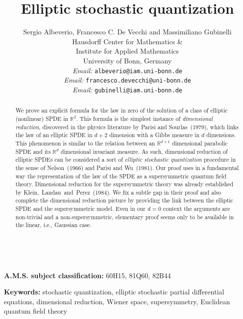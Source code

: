 \documentclass[a4paper,10pt]{article}
\newcommand{\tmaffiliation}[1]{\\ #1}
\newcommand{\tmemail}[1]{\\ \textit{Email:} \texttt{#1}}
\newcommand{\tmsep}{, }
\newcommand{\tmtextit}[1]{{\itshape{#1}}}
\newcommand{\tmkeywords}{\textbf{Keywords:} }
\newcommand{\tmmsc}{\textbf{A.M.S. subject classification:} }
\begin{document}
\title{ Elliptic stochastic quantization}

\author{
  Sergio Albeverio, Francesco C. De Vecchi and Massimiliano Gubinelli
  \tmaffiliation{Hausdorff Center for Mathematics \& \\
  Institute for Applied Mathematics\\
  University of Bonn, Germany}
  \tmemail{albeverio@iam.uni-bonn.de}
  \tmemail{francesco.devecchi@uni-bonn.de}
  \tmemail{gubinelli@iam.uni-bonn.de}
}

\date{}

\maketitle

\begin{abstract}
  We prove an explicit formula for the law in zero of the solution of a class
  of elliptic (nonlinear) SPDE in $\mathbb{R}^2$. This formula is the simplest
  instance of \tmtextit{dimensional reduction}, discovered in the physics
  literature by Parisi and Sourlas~(1979), which links the law of an elliptic
  SPDE in $d + 2$ dimension with a Gibbs measure in $d$ dimensions. This
  phenomenon is similar to the relation between an $\mathbb{R}^{d + 1}$
  dimensional parabolic SPDE and its $\mathbb{R}^d$ dimensional invariant
  measure. As such, dimensional reduction of elliptic SPDEs can be considered
  a sort of \tmtextit{elliptic stochastic quantization} procedure in the sense
  of Nelson~(1966) and Parisi and Wu~(1981). Our proof uses in a fundamental
  way the representation of the law of the SPDE as a supersymmetric quantum
  field theory. Dimensional reduction for the supersymmetric theory was
  already established by Klein,~Landau~and~Perez~(1984). We fix a subtle gap
  in their proof and also complete the dimensional reduction picture by
  providing the link between the elliptic SPDE and the supersymmetric model.
  Even in our $d = 0$ context the arguments are non-trivial and a
  non-supersymmetric, elementary proof seems only to be available in the
  linear, i.e., Gaussian case.
  
  \ 
\end{abstract}

\tmmsc{60H15}{\tmsep}{81Q60}{\tmsep}{82B44}

\tmkeywords{stochastic quantization}{\tmsep}{elliptic stochastic partial
differential equations}{\tmsep}{dimensional reduction}{\tmsep}{Wiener
space}{\tmsep}{supersymmetry}{\tmsep}{Euclidean quantum field theory }
\end{document}
